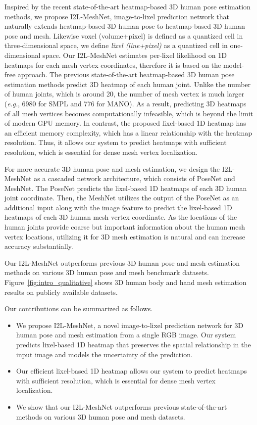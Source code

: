 \documentclass[runningheads]{llncs}
\begin{document}
Inspired by the recent state-of-the-art heatmap-based 3D human pose estimation methods, we propose I2L-MeshNet, image-to-lixel prediction network that naturally extends heatmap-based 3D human pose to heatmap-based 3D human pose and mesh.
Likewise voxel (volume+pixel) is defined as a quantized cell in three-dimensional space, we define \emph{lixel (line+pixel)} as a quantized cell in one-dimensional space.
Our I2L-MeshNet estimates per-lixel likelihood on 1D heatmaps for each mesh vertex coordinates, therefore it is based on the model-free approach.
The previous state-of-the-art heatmap-based 3D human pose estimation methods predict 3D heatmap of each human joint.
Unlike the number of human joints, which is around 20, the number of mesh vertex is much larger (\textit{e.g.}, 6980 for SMPL and 776 for MANO).
As a result, predicting 3D heatmaps of all mesh vertices becomes computationally infeasible, which is beyond the limit of modern GPU memory.
In contrast, the proposed lixel-based 1D heatmap has an efficient memory complexity, which has a linear relationship with the heatmap resolution.
Thus, it allows our system to predict heatmaps with sufficient resolution, which is essential for dense mesh vertex localization.


For more accurate 3D human pose and mesh estimation, we design the I2L-MeshNet as a cascaded network architecture, which consists of PoseNet and MeshNet. 
The PoseNet predicts the lixel-based 1D heatmaps of each 3D human joint coordinate.
Then, the MeshNet utilizes the output of the PoseNet as an additional input along with the image feature to predict the lixel-based 1D heatmaps of each 3D human mesh vertex coordinate.
As the locations of the human joints provide coarse but important information about the human mesh vertex locations, utilizing it for 3D mesh estimation is natural and can increase accuracy substantially.


Our I2L-MeshNet outperforms previous 3D human pose and mesh estimation methods on various 3D human pose and mesh benchmark datasets.
Figure~\ref{fig:intro_qualitative} shows 3D human body and hand mesh estimation results on publicly available datasets.


Our contributions can be summarized as follows.
\begin{itemize}
\item We propose I2L-MeshNet, a novel image-to-lixel prediction network for 3D human pose and mesh estimation from a single RGB image.
Our system predicts lixel-based 1D heatmap that preserves the spatial relationship in the input image and models the uncertainty of the prediction.
\item Our efficient lixel-based 1D heatmap allows our system to predict heatmaps with sufficient resolution, which is essential for dense mesh vertex localization.
\item We show that our I2L-MeshNet outperforms previous state-of-the-art methods on various 3D human pose and mesh datasets.
\end{itemize}
\end{document}
